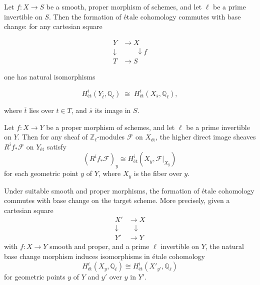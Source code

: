 \begin{theorem}
    
\end{theorem}

\begin{proposition}
Let $f : X \to S$ be a smooth, proper morphism of schemes, and let $\ell$ be a prime invertible on $S$. Then the formation of étale cohomology commutes with base change: for any cartesian square

\[
\begin{aligned}
Y &\longrightarrow X \\
\downarrow & \;\;\;\;\;\;\; \downarrow f \\
T &\longrightarrow S
\end{aligned}
\]

one has natural isomorphisms

$$ H^i_{\text{ét}}(Y_{\overline{t}}, \mathbb{Q}_\ell) \;\cong\; H^i_{\text{ét}}(X_{\overline{s}}, \mathbb{Q}_\ell), $$

where $\overline{t}$ lies over $t \in T$, and $\overline{s}$ its image in $S$.

\end{proposition}


\begin{theorem}
Let $f : X \to Y$ be a proper morphism of schemes, and let $\ell$ be a prime invertible on $Y$. Then for any sheaf of $\mathbb{Z}_\ell$-modules $\mathcal{F}$ on $X_{\text{ét}}$, the higher direct image sheaves $R^if_*\mathcal{F}$ on $Y_{\text{ét}}$ satisfy
$$
(R^i f_* \mathcal{F})_y \cong H^i_{\text{ét}}(X_y, \mathcal{F}|_{X_y})
$$
for each geometric point $y$ of $Y$, where $X_y$ is the fiber over $y$.
\end{theorem}

\begin{theorem}
Under suitable smooth and proper morphisms, the formation of étale cohomology commutes with base change on the target scheme. More precisely, given a cartesian square
\[
\begin{aligned}
X' &\to X \\
\downarrow & \;\;\;\downarrow \\
Y' &\to Y
\end{aligned}
\]
with $f:X \to Y$ smooth and proper, and a prime $\ell$ invertible on $Y$, the natural base change morphism induces isomorphisms in étale cohomology
$$
H^i_{\text{ét}}(X_y, \mathbb{Q}_\ell) \cong H^i_{\text{ét}}(X'_{y'}, \mathbb{Q}_\ell)
$$
for geometric points $y$ of $Y$ and $y'$ over $y$ in $Y'$.
\end{theorem}



